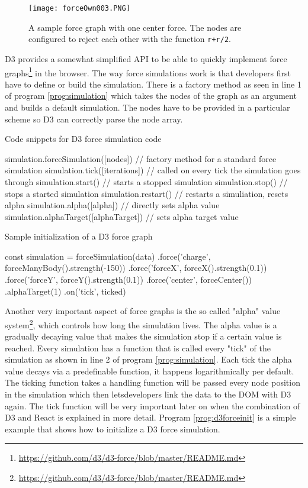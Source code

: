 \begin{figure}
  \centering
  \texttt{[image: forceOwn003.PNG]}
  \caption{A sample force graph with one center force. The nodes are configured to reject each other with the function \texttt{r+r/2}.}
  \label{fig:force004}
\end{figure}

D3 provides a somewhat simplified API to be able to quickly implement force graphs\footnote{\url{https://github.com/d3/d3-force/blob/master/README.md}} in the browser. The way force simulations work is that developers first have to define or build the simulation. There is a factory method as seen in line 1 of program \ref{prog:simulation} which takes the nodes of the graph as an argument and builds a default simulation. The nodes have to be provided in a particular scheme so D3 can correctly parse the node array. 

\begin{program}
\caption{Code snippets for D3 force simulation code}
\label{prog:simulation}
\begin{JsCode}
simulation.forceSimulation([nodes]) // factory method for a standard force simulation
simulation.tick([iterations]) // called on every tick the simulation goes through
simulation.start() // starts a stopped simulation
simulation.stop() // stops a started simulation
simulation.restart() // restarts a simuliation, resets alpha
simulation.alpha([alpha]) // directly sets alpha value
simulation.alphaTarget([alphaTarget]) // sets alpha target value
\end{JsCode}
\end{program}

\begin{program}
\caption{Sample initialization of a D3 force graph}
\label{prog:d3forceinit}
\begin{JsCode}
const simulation = forceSimulation(data)
  .force('charge', forceManyBody().strength(-150))
  .force('forceX', forceX().strength(0.1))
  .force('forceY', forceY().strength(0.1))
  .force('center', forceCenter())
  .alphaTarget(1)
  .on('tick', ticked)
\end{JsCode}
\end{program}

Another very important aspect of force graphs is the so called "alpha" value system\footnote{\url{https://github.com/d3/d3-force/blob/master/README.md}}, which controls how long the simulation lives. The alpha value is a gradually decaying value that makes the simulation stop if a certain value is reached. Every simulation has a function that is called every "tick" of the simulation as shown in line 2 of program \ref{prog:simulation}. Each tick the alpha value decays via a predefinable function, it happens logarithmically per default. The ticking function takes a handling function will be passed every node position in the simulation which then letsdevelopers link the data to the DOM with D3 again. The tick function will be very important later on when the combination of D3 and React is explained in more detail. Program \ref{prog:d3forceinit} is a simple example that shows how to initialize a D3 force simulation.

